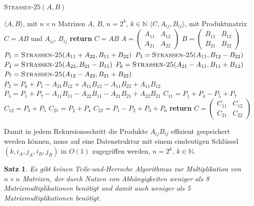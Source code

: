 \documentclass{scrartcl}
\newtheorem{satz}{Satz}[section]
\numberwithin{equation}{section}
\begin{document}
\begin{algorithm}
	\caption{\textsc{Strassen-25}$(A, B)$}
	\label{alg:strassen25}
	\begin{algorithmic}[1]
		\Require $\langle A, B \rangle$, mit $n \times n$ Matrizen $A$, $B$, $n = 2^k$, $k \in \mathbb{N}$
		\Ensure $\langle C, A_{ij}, B_{ij} \rangle$, mit Produktmatrix $C = AB$ und $A_{ij}$, $B_{ij}$
		 \textbf{return} $C = AB$
		\EndIf
		\State $A = \begin{pmatrix} A_{11} & A_{12} \\ A_{21} & A_{22} \end{pmatrix}$
		\State $B = \begin{pmatrix} B_{11} & B_{12} \\ B_{21} & B_{22} \end{pmatrix}$
		\State $P_1 = \textsc{Strassen-25}(A_{11} + A_{22}, B_{11} + B_{22})$
		\State $P_3 = \textsc{Strassen-25}(A_{11}, B_{12} - B_{22})$
		\State $P_4 = \textsc{Strassen-25}(A_{22}, B_{21} - B_{11})$
		\State $P_6 = \textsc{Strassen-25}(A_{21} - A_{11}, B_{11} + B_{12})$
		\State $P_7 = \textsc{Strassen-25}(A_{12} - A_{22}, B_{21} + B_{22})$
		\State $P_2 = P_6 + P_1 - A_{21}B_{12} + A_{11}B_{12} - A_{11}B_{22} + A_{11}B_{12}$ 
		\State $P_5 = P_1 + P_7 - A_{11}B_{11} - A_{22}B_{11} - A_{21}B_{21} + A_{22}B_{21}$
		\State $C_{11} = P_1 + P_4 - P_5 + P_7$
		\State $C_{12} = P_3 + P_5$
		\State $C_{21} = P_2 + P_4$
		\State $C_{22} = P_1 - P_2 + P_3 + P_6$
		\State \textbf{return} $C = \begin{pmatrix} C_{11} & C_{12} \\ C_{21} & C_{22} \end{pmatrix}$
	\end{algorithmic}
\end{algorithm}
Damit in jedem Rekursionsschritt die Produkte $A_{ij}B_{ij}$ effizient gespeichert werden können, muss auf eine Datenstruktur mit einem eindeutigen Schlüssel $(k, i_{A}, j_{A}, i_{B}, j_{B})$ in $O(1)$ zugegriffen werden, $n = 2^k$, $k \in \mathbb{N}$.
\begin{satz}
	Es gibt keinen Teile-und-Herrsche Algorithmus zur Multiplikation von $n \times n$ Matrizen, der durch Nutzen von Abhängigkeiten weniger als 8 Matrixmultiplikationen benötigt und damit auch weniger als 5 Matrixmultiplikationen benötigt. 
\end{satz}
\end{document}
